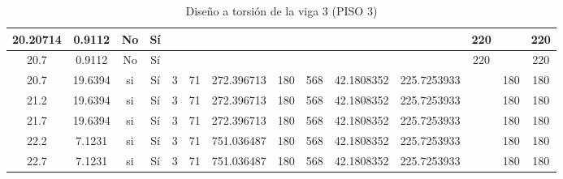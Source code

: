 \begin{table}[H]
{\begin{tabular}{|c|c|c|c|c|c|c|c|c|c|c|c|c|c|}
\hline
20.20714 & 0.9112 & No  & Sí  &     &     &     &     &     &     &     & 220 &     & 220 \bigstrut\\
\hline
20.7 & 0.9112 & No  & Sí  &     &     &     &     &     &     &     & 220 &     & 220 \bigstrut\\
\hline
20.7 & 19.6394 & si  & Sí  & 3   & 71  & 272.396713 & 180 & 568 & 42.1808352 & 225.7253933 &     & 180 & 180 \bigstrut\\
\hline
21.2 & 19.6394 & si  & Sí  & 3   & 71  & 272.396713 & 180 & 568 & 42.1808352 & 225.7253933 &     & 180 & 180 \bigstrut\\
\hline
21.7 & 19.6394 & si  & Sí  & 3   & 71  & 272.396713 & 180 & 568 & 42.1808352 & 225.7253933 &     & 180 & 180 \bigstrut\\
\hline
22.2 & 7.1231 & si  & Sí  & 3   & 71  & 751.036487 & 180 & 568 & 42.1808352 & 225.7253933 &     & 180 & 180 \bigstrut\\
\hline
22.7 & 7.1231 & si  & Sí  & 3   & 71  & 751.036487 & 180 & 568 & 42.1808352 & 225.7253933 &     & 180 & 180 \bigstrut\\
\hline
\end{tabular}%


  }
      \caption{Diseño a torsión de la viga 3 (PISO 3) }
  \label{tab:T VG3 P3 }%
\end{table}%
